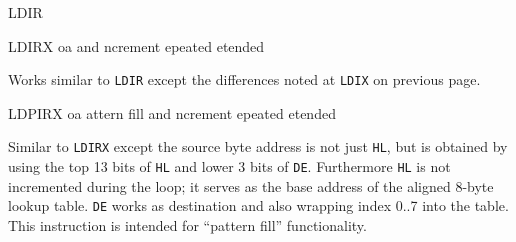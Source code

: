 \begin{basedescript}{
	\desclabelstyle{\multilinelabel}
	\desclabelwidth{3cm}}
\begin{DetailItem}{LDIR}{}
	\end{DetailItem}


	\begin{DetailItem}{LDIRX}{\DetailItemZXN}
		{oa and ncrement epeated etended}		
		{\SymLDIRX}

		Works similar to {\tt LDIR} except the differences noted at {\tt LDIX} on previous page.

		\begin{DetailEffects}
			\FlagsLDIRX
		\end{DetailEffects}
				
		\begin{DetailTiming}
		\end{DetailTiming}

	\end{DetailItem}


	\begin{DetailItem}{LDPIRX}{\DetailItemZXN}
		{oa attern fill and ncrement epeated etended}
		{\SymLDPIRX}

		Similar to {\tt LDIRX} except the source byte address is not just {\tt HL}, but is obtained by using the top 13 bits of {\tt HL} and lower 3 bits of {\tt DE}. Furthermore {\tt HL} is not incremented during the loop; it serves as the base address of the aligned 8-byte lookup table. {\tt DE} works as destination and also wrapping index 0..7 into the table. This instruction is intended for ``pattern fill'' functionality.


\end{DetailItem}
\end{basedescript}
